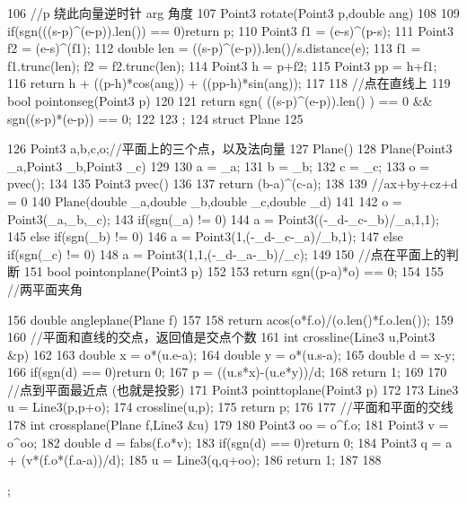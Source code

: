 \documentclass[11pt]{article}
\begin{document}
\begin{Code}
{106       //p 绕此向量逆时针 arg 角度
107       Point3 rotate(Point3 p,double ang)
108       {
109           if(sgn(((s-p)^(e-p)).len()) == 0)return p;
110           Point3 f1 = (e-s)^(p-s);
111           Point3 f2 = (e-s)^(f1);
112           double len = ((s-p)^(e-p)).len()/s.distance(e);
113           f1 = f1.trunc(len); f2 = f2.trunc(len);
114           Point3 h = p+f2;
115           Point3 pp = h+f1;
116           return h + ((p-h)*cos(ang)) + ((pp-h)*sin(ang));
117       }
118       //点在直线上
119       bool pointonseg(Point3 p)
120       {
121           return sgn( ((s-p)^(e-p)).len() ) == 0 && sgn((s-p)*(e-p))
                 == 0;
122       }
123 };
124 struct Plane
125 {
126     Point3 a,b,c,o;//平面上的三个点，以及法向量
127     Plane(){}
128     Plane(Point3 _a,Point3 _b,Point3 _c)
129     {
130         a = _a;
131         b = _b;
132         c = _c;
133         o = pvec();
134     }
135     Point3 pvec()
136     {
137         return (b-a)^(c-a);
138     }
139     //ax+by+cz+d = 0
140     Plane(double _a,double _b,double _c,double _d)
141     {
142         o = Point3(_a,_b,_c);
143         if(sgn(_a) != 0)
144              a = Point3((-_d-_c-_b)/_a,1,1);
145         else if(sgn(_b) != 0)
146              a = Point3(1,(-_d-_c-_a)/_b,1);
147         else if(sgn(_c) != 0)
148              a = Point3(1,1,(-_d-_a-_b)/_c);
149     }
150     //点在平面上的判断
151     bool pointonplane(Point3 p)
152     {
153         return sgn((p-a)*o) == 0;
154     }
155     //两平面夹角


156        double angleplane(Plane f)
157        {
158            return acos(o*f.o)/(o.len()*f.o.len());
159        }
160        //平面和直线的交点，返回值是交点个数
161        int crossline(Line3 u,Point3 &p)
162        {
163            double x = o*(u.e-a);
164            double y = o*(u.s-a);
165            double d = x-y;
166            if(sgn(d) == 0)return 0;
167            p = ((u.s*x)-(u.e*y))/d;
168            return 1;
169        }
170        //点到平面最近点 (也就是投影)
171        Point3 pointtoplane(Point3 p)
172        {
173            Line3 u = Line3(p,p+o);
174            crossline(u,p);
175            return p;
176        }
177        //平面和平面的交线
178        int crossplane(Plane f,Line3 &u)
179        {
180            Point3 oo = o^f.o;
181            Point3 v = o^oo;
182            double d = fabs(f.o*v);
183            if(sgn(d) == 0)return 0;
184            Point3 q = a + (v*(f.o*(f.a-a))/d);
185            u = Line3(q,q+oo);
186            return 1;
187        }
188 };
\end{Code}
\end{document}
